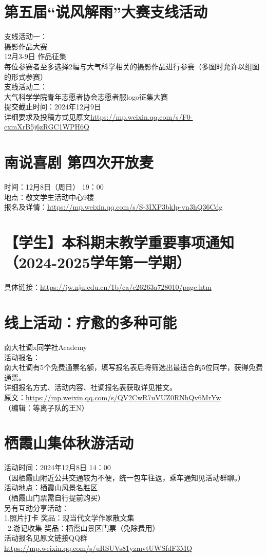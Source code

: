 \documentclass[letterpaper, 12pt]{article}
\begin{document}
\begin{multicols}{2}
\section{第五届“说风解雨”大赛支线活动}
支线活动一：\\
摄影作品大赛\\
12月3-9日 作品征集\\
每位参赛者至多选择2幅与大气科学相关的摄影作品进行参赛（多图时允许以组图的形式参赛）\\
支线活动二：\\
大气科学学院青年志愿者协会志愿者服logo征集大赛\\
提交截止时间：2024年12月9日\\
详细要求及投稿方式见原文\url{https://mp.weixin.qq.com/s/F0-cxmXrB5j6zRGC1WPH6Q}


\section{南说喜剧 第四次开放麦}
时间：12月8日（周日） 19：00\\
地点：敬文学生活动中心9楼\\
报名及详情：\url{https://mp.weixin.qq.com/s/S-3IXP3bklp-vn3hQ36Cdg}\\
\section{【学生】本科期末教学重要事项通知 （2024-2025学年第一学期）}
具体链接：\url{https://jw.nju.edu.cn/1b/ca/c26263a728010/page.htm}\\

\section{线上活动：疗愈的多种可能}
南大社调x同学社Academy\\
活动报名：\\
南大社调有5个免费通票名额，填写报名表后将筛选出最适合的5位同学，获得免费通票。\\
详细报名方式、活动内容、社调报名表获取详见推文。\\
原文：\url{https://mp.weixin.qq.com/s/QV2CwR7uVUZ0RNhQv6MrYw}\\
（编辑：等离子队的王N）


\section{栖霞山集体秋游活动}
活动时间：2024年12月8日 14：00\\
（因栖霞山附近公共交通较为不便，统一包车往返，乘车通知见活动群聊。）\\
活动地点：栖霞山风景名胜区\\
（栖霞山门票需自行提前购买）\\
另有互动分享活动：\\
1.照片打卡 奖品：现当代文学作家散文集\\\
2.游记收集 奖品：栖霞山景区门票（免除费用）\\
活动报名见原文链接QQ群\url{https://mp.weixin.qq.com/s/uRSUVs81yzmvtUWSfdF3MQ}



\end{multicols}
\end{document}

